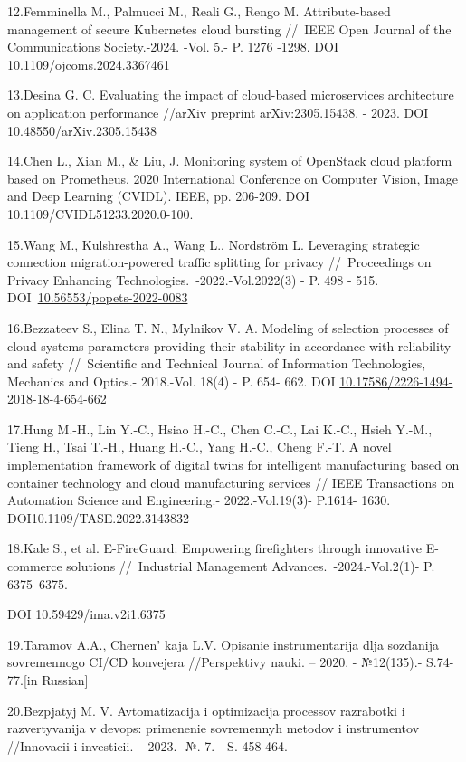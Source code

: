 {12.Femminella M., Palmucci M., Reali G., Rengo M. Attribute-based
management of secure Kubernetes cloud bursting //~IEEE Open Journal of
the Communications Society.-2024. -Vol. 5.- P. 1276 -1298. DOI
\href{https://doi.org/10.1109/ojcoms.2024.3367461}{10.1109/ojcoms.2024.3367461}

13.Desina G. C. Evaluating the impact of cloud-based microservices
architecture on application performance //arXiv preprint
arXiv:2305.15438. - 2023. DOI 10.48550/arXiv.2305.15438

14.Chen L., Xian M., \& Liu, J. Monitoring system of OpenStack cloud
platform based on Prometheus. 2020 International Conference on Computer
Vision, Image and Deep Learning (CVIDL). IEEE, pp. 206-209. DOI
10.1109/CVIDL51233.2020.0-100.

15.Wang M., Kulshrestha A., Wang L., Nordström L. Leveraging strategic
connection migration-powered traffic splitting for privacy
//~Proceedings on Privacy Enhancing Technologies.~-2022.-Vol.2022(3) -
P. 498 - 515.
DOI~\href{https://doi.org/10.56553/popets-2022-0083}{10.56553/popets-2022-0083}

16.Bezzateev S., Elina T. N., Mylnikov V. A. Modeling of selection
processes of cloud systems parameters providing their stability in
accordance with reliability and safety //~Scientific and Technical
Journal of Information Technologies, Mechanics and Optics.- 2018.-Vol.
18(4) - P. 654- 662. DOI
\href{https://doi.org/10.17586/2226-1494-2018-18-4-654-662}{10.17586/2226-1494-2018-18-4-654-662}

17.Hung M.-H., Lin Y.-C., Hsiao H.-C., Chen C.-C., Lai K.-C., Hsieh
Y.-M., Tieng H., Tsai T.-H., Huang H.-C., Yang H.-C., Cheng F.-T. A
novel implementation framework of digital twins for intelligent
manufacturing based on container technology and cloud manufacturing
services // IEEE Transactions on Automation Science and Engineering.-
2022.-Vol.19(3)- P.1614- 1630. DOI10.1109/TASE.2022.3143832

18.Kale S., et al. E-FireGuard: Empowering firefighters through
innovative E-commerce solutions //~Industrial Management
Advances.~-2024.-Vol.2(1)- P. 6375--6375.

DOI 10.59429/ima.v2i1.6375

19.Taramov A.A., Chernen' kaja L.V. Opisanie
instrumentarija dlja sozdanija sovremennogo CI/CD konvejera
//Perspektivy nauki. -- 2020. - №12(135).- S.74-77.{[}in Russian{]}

20.Bezpjatyj M. V. Avtomatizacija i optimizacija processov razrabotki i
razvertyvanija v devops: primenenie sovremennyh metodov i instrumentov
//Innovacii i investicii. -- 2023.- №. 7. - S. 458-464.

}
